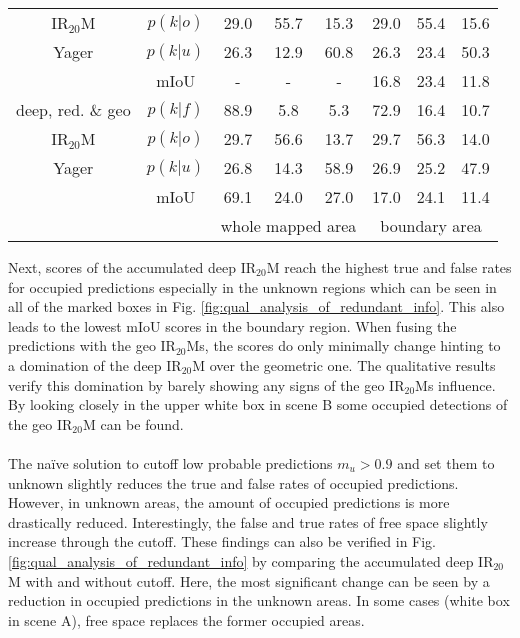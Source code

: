 \begin{center}
\begin{tabular}{c|c|ccc|ccc}
		IR$_{20}$M&$p(k|o)$ & \textcolor{myred}{29.0} & \textcolor{mygreen}{55.7} & 15.3& \textcolor{myred}{29.0} & \textcolor{mygreen}{55.4} & 15.6 \\
		Yager&$p(k|u)$ & 26.3 & 12.9 & 60.8& 26.3 & 23.4 & 50.3 \\
		& mIoU & - & - & - &16.8&23.4&11.8 \\
		\hline
		deep, red. \& geo&$p(k|f)$ & \textcolor{mygreen}{88.9} & \textcolor{myred}{5.8} & 5.3& \textcolor{mygreen}{72.9} & \textcolor{myred}{16.4} & 10.7 \\
		IR$_{20}$M&$p(k|o)$ & \textcolor{myred}{29.7} & \textcolor{mygreen}{56.6} & 13.7& \textcolor{myred}{29.7} & \textcolor{mygreen}{56.3} & 14.0 \\
		Yager&$p(k|u)$ & 26.8 & 14.3 & 58.9& 26.9 & 25.2 & 47.9 \\
		& mIoU &69.1&24.0&27.0&17.0&24.1&11.4 \\
		\hline
		& & \multicolumn{3}{c|}{whole mapped area} & \multicolumn{3}{c}{boundary area}
	\end{tabular}
\end{center}
Next, scores of the accumulated deep IR$_{20}$M reach the highest true and false rates for occupied predictions especially in the unknown regions which can be seen in all of the marked boxes in Fig. \ref{fig:qual_analysis_of_redundant_info}. This also leads to the lowest mIoU scores in the boundary region. When fusing the predictions with the geo IR$_{20}$Ms, the scores do only minimally change hinting to a domination of the deep IR$_{20}$M over the geometric one. The qualitative results verify this domination by barely showing any signs of the geo IR$_{20}$Ms influence. By looking closely in the upper white box in scene B some occupied detections of the geo IR$_{20}$M can be found.
\\\\
The na\"ive solution to cutoff low probable predictions $m_u > 0.9$ and set them to unknown slightly reduces the true and false rates of occupied predictions. However, in unknown areas, the amount of occupied predictions is more drastically reduced. Interestingly, the false and true rates of free space slightly increase through the cutoff. These findings can also be verified in Fig. \ref{fig:qual_analysis_of_redundant_info} by comparing the accumulated deep IR$_{20}$M with and without cutoff. Here, the most significant change can be seen by a reduction in occupied predictions in the unknown areas. In some cases (white box in scene A), free space replaces the former occupied areas.

